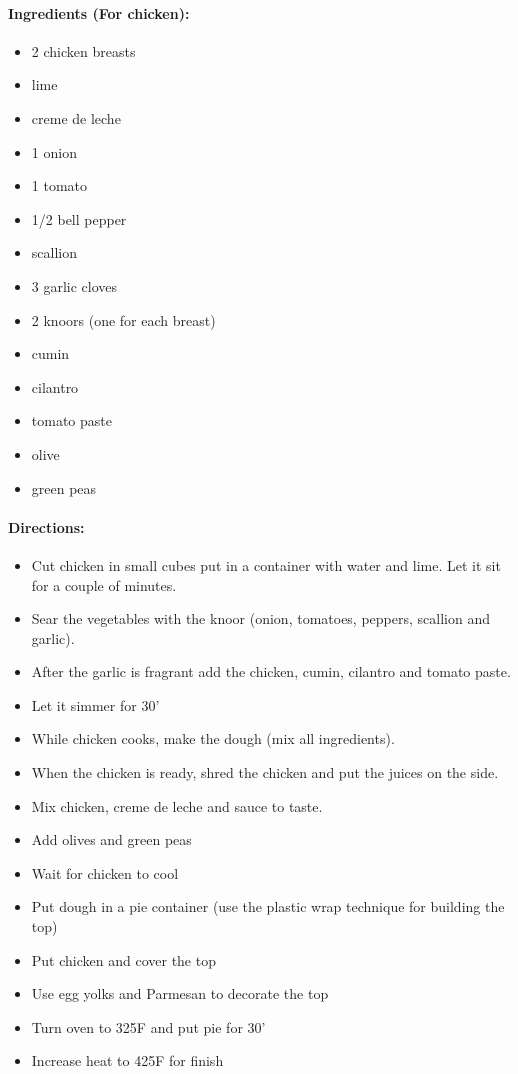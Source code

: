 \documentclass{article}
\begin{document}
\paragraph{Ingredients (For chicken):}

\begin{itemize}
	\item 2 chicken breasts
	\item lime
	\item creme de leche
	\item 1 onion
	\item 1 tomato
	\item 1/2 bell pepper
	\item scallion
	\item 3 garlic cloves
	\item 2 knoors (one for each breast)
	\item cumin
	\item cilantro
	\item tomato paste
	\item olive
	\item green peas
\end{itemize}

\paragraph{Directions:}
\begin{itemize}
	\item Cut chicken in small cubes put in a container with water and lime. Let it sit for a couple of minutes.
	\item Sear the vegetables with the knoor (onion, tomatoes, peppers, scallion and garlic).
	\item After the garlic is fragrant add the chicken, cumin, cilantro and tomato paste. 
	\item Let it simmer for 30'
	\item While chicken cooks, make the dough (mix all ingredients).
	\item When the chicken is ready, shred the chicken and put the juices on the side.
	\item Mix chicken, creme de leche and sauce to taste. 
	\item Add olives and green peas
	\item Wait for chicken to cool
	\item Put dough in a pie container (use the plastic wrap technique for building the top)
	\item Put chicken and cover the top
	\item Use egg yolks and Parmesan to decorate the top
	\item Turn oven to 325F and put pie for 30'
	\item Increase heat to 425F for finish
\end{itemize}
\end{document}

